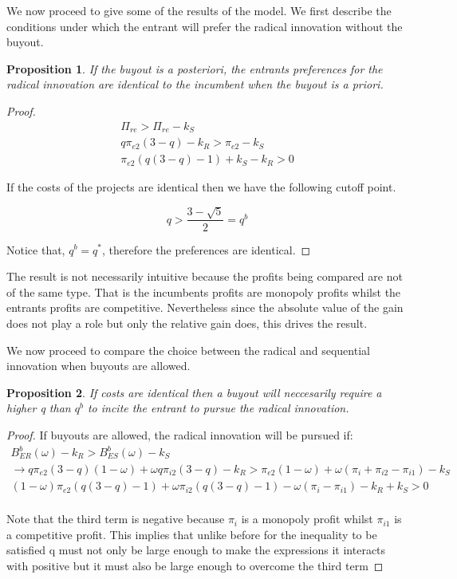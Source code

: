 \documentclass[11pt]{article}
\newtheorem{proposition}{Proposition}
\begin{document}
We now proceed to give some of the results of the model. We first describe the conditions under which the entrant will prefer the radical innovation without the buyout. 

\begin{proposition}
If the buyout is a posteriori, the entrants preferences for the radical innovation are identical to the incumbent when the buyout is a priori.
\end{proposition}

\begin{proof}
\begin{align*}
\Pi_{re} > \Pi_{re}-k_S  \\
q\pi_{e2}(3-q)-k_R>  \pi_{e2}-k_S \\
\pi_{e2}(q(3-q)-1)+k_S-k_R > 0
\end{align*}

If the costs of the projects are identical then we have the following cutoff point. 

\begin{equation*}
q> \frac{3-\sqrt{5}}{2}=q^b
\end{equation*}

Notice that, $q^b=q^*$, therefore the preferences are identical. 
\end{proof}

The result is not necessarily intuitive because the profits being compared are not of the same type. That is the incumbents profits are monopoly profits whilst the entrants profits are competitive. Nevertheless since the absolute value of the gain does not play a role but only the relative gain does, this drives the result. 

We now proceed to compare the choice between the radical and sequential innovation when buyouts are allowed.

\begin{proposition}
\label{higherq}
If costs are identical then a buyout will neccesarily require a higher q than $q^b$ to incite the entrant to pursue the radical innovation. 
\end{proposition}

\begin{proof}
If buyouts are allowed, the radical innovation will be pursued if:
\begin{align*}
B_{ER}^{b}(\omega)-k_R>B_{ES}^{b}(\omega)-k_S \\
\rightarrow q\pi_{e2}(3-q)(1-\omega)
+ \omega q 
\pi_{i2} (3-q)-k_R
> \pi_{e2}(1-\omega)+ \omega (\pi_{i} +  \pi_{i2} - \pi_{i1} ) -k_S \\
(1-\omega) \pi_{e2}(q(3-q)-1)
+ \omega \pi_{i2} (q(3-q)-1)-\omega(\pi_i- \pi_{i1}) -k_R+k_S
> 0 \\
\end{align*}

Note that the third term is negative because $\pi_i$ is a monopoly profit whilst  $\pi_{i1}$ is a competitive profit. This implies that unlike before for the inequality to be satisfied q must not only be large enough to make the expressions it interacts with positive but it must also be large enough to overcome the third term 
\end{proof}
\end{document}
